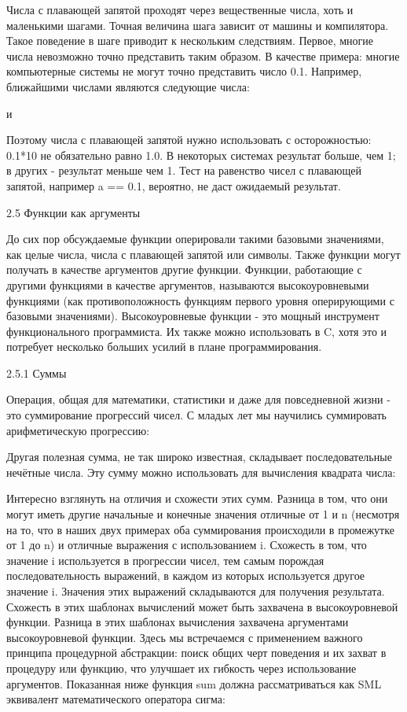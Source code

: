 Числа с плавающей запятой проходят через вещественные числа, хоть и маленькими шагами. Точная величина шага зависит от машины и компилятора. Такое поведение в шаге приводит к нескольким следствиям. Первое, многие числа невозможно точно представить таким образом. В качестве примера: многие компьютерные системы не могут точно представить число 0.1. Например, ближайшими числами являются следующие числа:

и

Поэтому числа с плавающей запятой нужно использовать с осторожностью: 0.1*10 не обязательно равно 1.0. В некоторых системах результат больше, чем 1; в других - результат меньше чем 1. Тест на равенство чисел с плавающей запятой, например a == 0.1, вероятно, не даст ожидаемый результат.

2.5 Функции как аргументы

До сих пор обсуждаемые функции оперировали такими базовыми значениями, как целые числа, числа с плавающей запятой или символы. Также функции могут получать в качестве аргументов другие функции. Функции, работающие с другими функциями в качестве аргументов, называются высокоуровневыми функциями (как противоположность функциям первого уровня оперирующими с базовыми значениями). Высокоуровневые функции - это мощный инструмент функционального программиста. Их также можно использовать в C, хотя это и потребует несколько больших усилий в плане программирования.

2.5.1 Суммы

Операция, общая для математики, статистики и даже для повседневной жизни - это суммирование прогрессий чисел. С младых лет мы научились суммировать арифметическую прогрессию:

Другая полезная сумма, не так широко известная, складывает последовательные нечётные числа. Эту сумму можно использовать для вычисления квадрата числа:

Интересно взглянуть на отличия и схожести этих сумм. Разница в том, что они могут иметь другие начальные и конечные значения отличные от 1 и n (несмотря на то, что в наших двух примерах оба суммирования происходили в промежутке от 1 до n) и отличные выражения с использованием i. Схожесть в том, что значение i используется в прогрессии чисел, тем самым порождая последовательность выражений, в каждом из которых используется другое значение i. Значения этих выражений складываются для получения результата. Схожесть в этих шаблонах вычислений может быть захвачена в высокоуровневой функции. Разница в этих шаблонах вычисления захвачена аргументами высокоуровневой функции. Здесь мы встречаемся с применением важного принципа процедурной абстракции: поиск общих черт поведения и их захват в процедуру или функцию, что улучшает их гибкость через использование аргументов. Показанная ниже функция sum должна рассматриваться как SML эквивалент математического оператора сигма:

